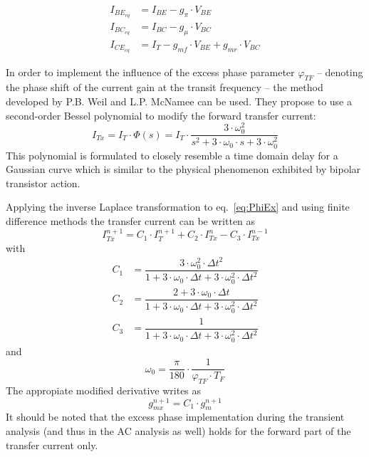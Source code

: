 \begin{align}
I_{BE_{eq}} &= I_{BE} - g_{\pi} \cdot V_{BE}\\
I_{BC_{eq}} &= I_{BC} - g_{\mu} \cdot V_{BC}\\
I_{CE_{eq}} &= I_{T} - g_{mf} \cdot V_{BE} + g_{mr} \cdot V_{BC}
\end{align}

In order to implement the influence of the excess phase parameter
$\varphi_{TF}$ -- denoting the phase shift of the current gain at the
transit frequency -- the method developed by P.B. Weil and
L.P. McNamee \cite{Weil} can be used.  They propose to use a
second-order Bessel polynomial to modify the forward transfer current:
\begin{equation}
\label{eq:PhiEx}
I_{Tx} = I_T\cdot \Phi\left(s\right) = I_T\cdot \dfrac{3\cdot\omega_0^2}{s^2 + 3\cdot\omega_0\cdot s + 3\cdot\omega_0^2}
\end{equation}
This polynomial is formulated to closely resemble a time domain delay
for a Gaussian curve which is similar to the physical phenomenon
exhibited by bipolar transistor action.

\addvspace{12pt}

Applying the inverse Laplace transformation to eq.~\eqref{eq:PhiEx}
and using finite difference methods the transfer current can be
written as
\begin{equation}
I_{Tx}^{n+1} = C_1\cdot I_{T}^{n+1} + C_2\cdot I_{Tx}^{n} - C_3\cdot I_{Tx}^{n-1}
\end{equation}
with
\begin{align}
C_1 &= \dfrac{3\cdot\omega_0^2\cdot \Delta t^2}{1 + 3\cdot\omega_0\cdot\Delta t + 3\cdot\omega_0^2\cdot \Delta t^2}\\
\label{eq:exC2}
C_2 &= \dfrac{2 + 3\cdot\omega_0\cdot\Delta t}{1 + 3\cdot\omega_0\cdot\Delta t + 3\cdot\omega_0^2\cdot \Delta t^2}\\
\label{eq:exC3}
C_3 &= \dfrac{1}{1 + 3\cdot\omega_0\cdot \Delta t + 3\cdot\omega_0^2\cdot \Delta t^2}
\end{align}
and
\begin{equation}
\omega_0 = \dfrac{\pi}{180}\cdot\dfrac{1}{\varphi_{TF}\cdot T_F}
\end{equation}
The appropiate modified derivative writes as
\begin{equation}
g_{mx}^{n+1} = C_1\cdot g_{m}^{n+1}
\end{equation}
It should be noted that the excess phase implementation during the
transient analysis (and thus in the AC analysis as well) holds for the
forward part of the transfer current only.

